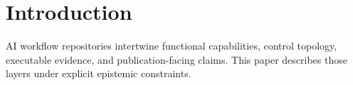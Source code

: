 \section{Introduction}

AI workflow repositories intertwine functional capabilities, control topology, executable evidence, and publication-facing claims. This paper describes those layers under explicit epistemic constraints.

